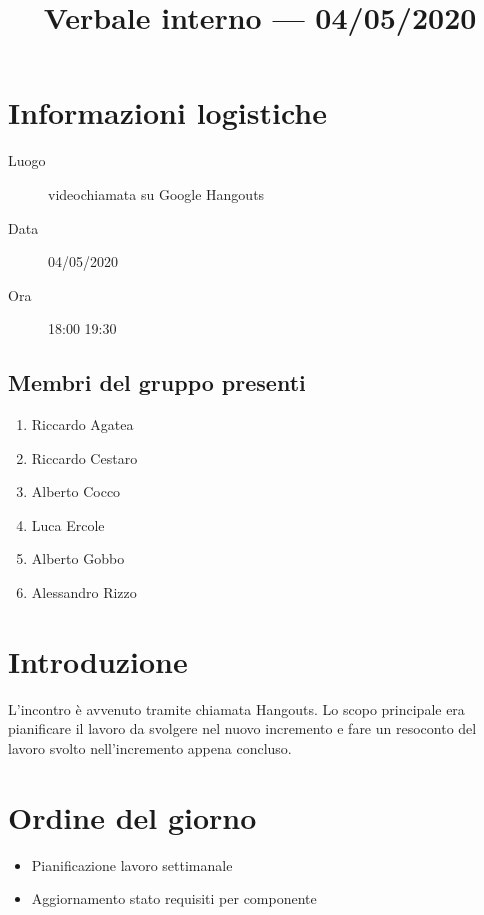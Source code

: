 \documentclass{article}
\title{Verbale interno --- 04/05/2020}
\begin{document}


\section{Informazioni logistiche}%
\label{sec:informazioni_logistiche}

\begin{description}
  \item [Luogo] videochiamata su Google Hangouts
  \item [Data] 04/05/2020
  \item [Ora] 18:00  19:30
\end{description}

\subsection{Membri del gruppo presenti}%
\label{sub:membri_del_gruppo_presenti}

\begin{enumerate}
  \item Riccardo Agatea
  \item Riccardo Cestaro
  \item Alberto Cocco
  \item Luca Ercole
  \item Alberto Gobbo
  \item Alessandro Rizzo
\end{enumerate}

\section{Introduzione}%
\label{sec:introduzione}
L'incontro è avvenuto tramite chiamata Hangouts.
Lo scopo principale era pianificare il lavoro da svolgere nel nuovo incremento e fare un resoconto del lavoro svolto nell'incremento appena concluso.

\section{Ordine del giorno}%
\label{sec:ordine_del_giorno}

\begin{itemize}
  \item Pianificazione lavoro settimanale
  \item Aggiornamento stato requisiti per componente
\end{itemize}
\end{document}

